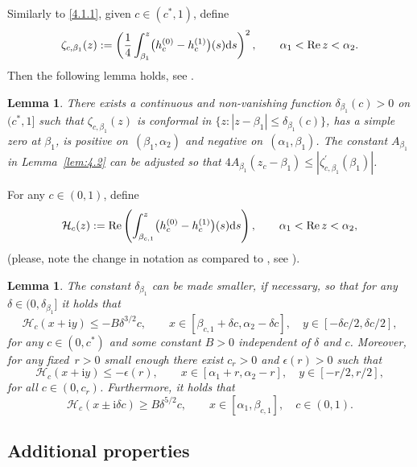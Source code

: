 \documentclass[10pt,a4paper]{amsart}
\numberwithin{equation}{section}
\newtheorem{Lemma}[Theorem]{Lemma}
\newcommand{\re}{\operatorname{Re} }
\newcommand{\ic}{\mathrm{i}}
\begin{document}
Similarly to \eqref{4.1.1}, given $ c\in( c^*,1) $, define
\begin{equation}
\label{4.4.1}
\zeta_{c,\beta_1}(z) := \left(\frac14\int_{\beta_1}^z\bigl(h_c^{(0)}-h_c^{(1)}\bigr)(s) {\rm d}s\right)^2, \qquad \alpha_1<\re z<\alpha_2.
\end{equation}
Then the following lemma holds, see \cite[Lemma~7.7]{ApDenYa21}.

\begin{Lemma}
\label{lem:4.4}
There exists a continuous and non-vanishing function $ \delta_{\beta_1}(c)>0 $ on $ (c^*,1] $ such that $ \zeta_{c,\beta_1}(z) $ is conformal in $ \{z : |z-\beta_1|\leq\delta_{\beta_1}(c) \} $, has a simple zero at $ \beta_1 $, is positive on~$ (\beta_1,\alpha_2) $ and negative on~$ (\alpha_1,\beta_1) $. The constant $ A_{\beta_1} $ in Lemma~{\rm\ref{lem:4.2}} can be adjusted so that $ 4A_{\beta_1}(z_c-\beta_1) \leq |\zeta_{c,\beta_1}^\prime(\beta_1)| $.
\end{Lemma}

For any $ c\in(0,1) $, define
\begin{equation}
\label{calH}
\mathcal H_c(z) := \re \left( \int_{\beta_{c,1}}^z \bigl( h_c^{(0)}-h_c^{(1)}\bigr)(s){\rm d}s \right), \qquad \alpha_1<\re z<\alpha_2,
\end{equation}
(please, note the change in notation as compared to \cite[Lemma~7.8]{ApDenYa21}, see \cite[equation~(7.30)]{ApDenYa21}).

\begin{Lemma}
\label{lem:4.6}
The constant $ \delta_{\beta_1} $ can be made smaller, if necessary, so that for any $ \delta\in(0,\delta_{\beta_1}] $ it holds that
\[
\mathcal H_c(x+\ic y) \leq -B\delta^{3/2}c, \qquad x\in[\beta_{c,1}+\delta c,\alpha_2-\delta c], \quad y\in[-\delta c/2,\delta c/2],
\]
for any $ c\in(0,c^*) $ and some constant $ B>0 $ independent of $ \delta $ and $ c $. Moreover, for any fixed~${ r>0} $ small enough there exist $ c_r>0 $ and $ \epsilon(r)>0 $ such that
\[
\mathcal H_c(x+\ic y) \leq -\epsilon(r), \qquad x\in[\alpha_1+r,\alpha_2-r],\quad y\in[-r/2,r/2],
\]
for all $ c\in(0,c_r) $. Furthermore, it holds that
\[
\mathcal H_c(x \pm \ic\delta c) \geq B\delta^{5/2} c, \qquad x\in[\alpha_1,\beta_{c,1}], \quad c\in(0,1).
\]
\end{Lemma}

\subsection{Additional properties}
\end{document}
